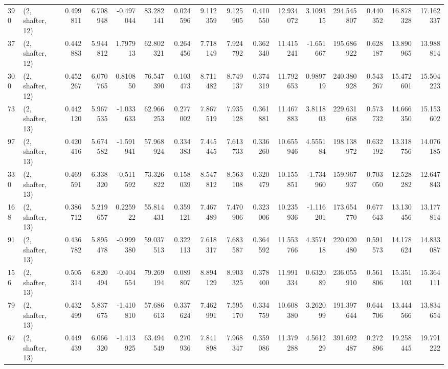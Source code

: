 \begin{tabular}{llrrrrrrrrrrrrrr}
390 &  (2, shafter, 12) &   0.499811 &   6.708948 &  -0.497044 &    83.282141 &   0.024596 &   9.112359 &   9.125905 &  0.410550 &  12.934072 &   3.109315 &   294.545807 &   0.440352 &  16.878328 &  17.162337 \\
37  &  (2, shafter, 12) &   0.442883 &   5.944812 &   1.797913 &    62.802321 &   0.264456 &   7.718149 &   7.924792 &  0.362340 &  11.415241 &  -1.651667 &   195.686922 &   0.628187 &  13.890965 &  13.988814 \\
300 &  (2, shafter, 12) &   0.452267 &   6.070765 &   0.810850 &    76.547390 &   0.103473 &   8.711482 &   8.749137 &  0.374319 &  11.792653 &   0.989719 &   240.380928 &   0.543267 &  15.472601 &  15.504223 \\
73  &  (2, shafter, 13) &   0.442120 &   5.967535 &  -1.033633 &    62.966253 &   0.277002 &   7.867519 &   7.935128 &  0.361881 &  11.467883 &   3.811803 &   229.631668 &   0.573732 &  14.666350 &  15.153602 \\
97  &  (2, shafter, 13) &   0.420416 &   5.674582 &  -1.591941 &    57.968924 &   0.334383 &   7.445445 &   7.613733 &  0.336260 &  10.655946 &   4.555184 &   198.138972 &   0.632192 &  13.318756 &  14.076185 \\
330 &  (2, shafter, 13) &   0.469591 &   6.338320 &  -0.511592 &    73.326822 &   0.158039 &   8.547812 &   8.563108 &  0.320479 &  10.155851 &  -1.734960 &   159.967937 &   0.703050 &  12.528282 &  12.647843 \\
168 &  (2, shafter, 13) &   0.386712 &   5.219657 &   0.225922 &    55.814431 &   0.359121 &   7.467489 &   7.470906 &  0.323006 &  10.235936 &  -1.116201 &   173.654770 &   0.677643 &  13.130456 &  13.177814 \\
91  &  (2, shafter, 13) &   0.436782 &   5.895478 &  -0.999380 &    59.037513 &   0.322113 &   7.618317 &   7.683587 &  0.364592 &  11.553766 &   4.357418 &   220.020480 &   0.591573 &  14.178624 &  14.833087 \\
156 &  (2, shafter, 13) &   0.505314 &   6.820494 &  -0.404554 &    79.269194 &   0.089807 &   8.894129 &   8.903325 &  0.378400 &  11.991334 &   0.632089 &   236.055910 &   0.561806 &  15.351103 &  15.364111 \\
79  &  (2, shafter, 13) &   0.432499 &   5.837675 &  -1.410810 &    57.686613 &   0.337624 &   7.462991 &   7.595170 &  0.334759 &  10.608380 &   3.262099 &   191.397644 &   0.644706 &  13.444566 &  13.834654 \\
67  &  (2, shafter, 13) &   0.449439 &   6.066320 &  -1.413925 &    63.494549 &   0.270936 &   7.841898 &   7.968347 &  0.359086 &  11.379288 &   4.561229 &   391.692487 &   0.272896 &  19.258445 &  19.791222 \\

\end{tabular}

